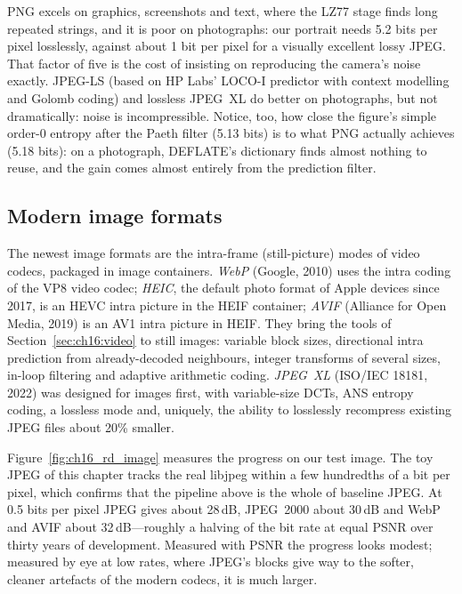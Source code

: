 PNG excels on graphics, screenshots and text, where the LZ77 stage finds long repeated strings, and
it is poor on photographs: our portrait needs 5.2 bits per pixel losslessly, against about 1 bit per
pixel for a visually excellent lossy JPEG. That factor of five is the cost of insisting on
reproducing the camera's noise exactly. JPEG-LS (based on HP Labs' LOCO-I predictor with context
modelling and Golomb coding) and lossless JPEG~XL do better on photographs, but not dramatically:
noise is incompressible. Notice, too, how close the figure's simple order-0 entropy after the Paeth
filter (5.13 bits) is to what PNG actually achieves (5.18 bits): on a photograph, DEFLATE's
dictionary finds almost nothing to reuse, and the gain comes almost entirely from the prediction
filter.


\subsection{Modern image formats}

The newest image formats are the intra-frame (still-picture) modes of video codecs, packaged in image
containers. \emph{WebP} (Google, 2010) uses the intra coding of the VP8 video codec; \emph{HEIC}, the
default photo format of Apple devices since 2017, is an HEVC intra picture in the HEIF container;
\emph{AVIF} (Alliance for Open Media, 2019) is an AV1 intra picture in HEIF. They bring the tools of
Section~\ref{sec:ch16:video} to still images: variable block sizes, directional intra prediction from
already-decoded neighbours, integer transforms of several sizes, in-loop filtering and adaptive
arithmetic coding. \emph{JPEG~XL} (ISO/IEC 18181, 2022) was designed for images first, with variable-size
DCTs, ANS entropy coding, a lossless mode and, uniquely, the ability to losslessly recompress existing
JPEG files about 20\% smaller.

Figure~\ref{fig:ch16_rd_image} measures the progress on our test image. The toy JPEG of this chapter
tracks the real libjpeg within a few hundredths of a bit per pixel, which confirms that the pipeline above
is the whole of baseline JPEG. At 0.5 bits per pixel JPEG gives about 28\,dB, JPEG~2000 about 30\,dB and
WebP and AVIF about 32\,dB---roughly a halving of the bit rate at equal PSNR over thirty years of
development. Measured with PSNR the progress looks modest; measured by eye at low rates, where JPEG's
blocks give way to the softer, cleaner artefacts of the modern codecs, it is much larger.

